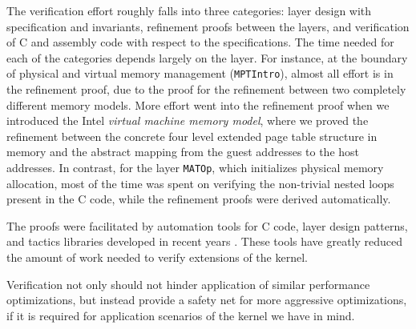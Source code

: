 {The verification effort roughly falls into three categories: layer
design with specification and invariants, refinement proofs between
the layers, and verification of C and assembly code with respect to
the specifications. The time needed for each of the categories depends
largely on the layer.  For instance, at the boundary of physical and
virtual memory management (\texttt{MPTIntro}), almost all effort
is in the refinement proof, due to the proof for the refinement between
two completely different memory models. More effort went into the
refinement proof when we introduced the Intel \emph{virtual machine
memory model}, where we proved the refinement between the concrete
four level extended page table structure in memory and the abstract
mapping from the guest addresses to the host addresses.
In contrast, for the layer \texttt{MATOp},
which initializes physical memory allocation,
most of the time was spent on verifying
the non-trivial nested loops present in the C code,
while the refinement proofs were derived automatically. 

The proofs were facilitated by automation tools for C
code, layer design patterns, and tactics libraries developed in
recent years \cite{dscal15}. These tools have greatly
reduced the amount of work needed to verify extensions of the kernel.


Verification not only
should not hinder application of similar performance optimizations,
but instead provide a safety net for more aggressive optimizations, if
it is required for application scenarios of the kernel we have in
mind.
}
